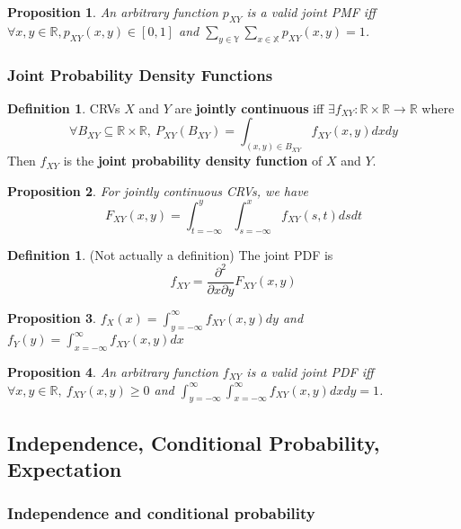 \documentclass[12pt]{article}
\newtheorem*{prop*}{Proposition}
\theoremstyle{definition}
\newtheorem{defn}{Definition}[subsection]
\newtheorem*{defn*}{Definition}
\newcommand{\R}{\mathbb{R}}
\newcommand{\X}{\mathbb{X}}
\newcommand{\Y}{\mathbb{Y}}
\begin{document}
\begin{prop*}
  An arbitrary function $p_{XY}$ is a valid joint PMF iff $\forall x, y \in \R, p_{XY}(x, y) \in [0, 1]$ and $\sum_{y \in \Y}\sum_{x \in \X}p_{XY}(x, y) = 1$.
\end{prop*}

\subsubsection{Joint Probability Density Functions}

\begin{defn*}
  CRVs $X$ and $Y$ are \textbf{jointly continuous} iff $\exists f_{XY} : \R \times \R \to \R$ where
  $$\forall B_{XY} \subseteq \R \times \R,\ P_{XY}(B_{XY}) = \int_{(x, y) \in B_{XY}}f_{XY}(x, y)dxdy$$
  Then $f_{XY}$ is the \textbf{joint probability density function} of $X$ and $Y$.
\end{defn*}

\begin{prop*}
  For jointly continuous CRVs, we have
  $$F_{XY}(x, y) = \int_{t = -\infty}^y\int_{s = -\infty}^xf_{XY}(s, t)dsdt$$
\end{prop*}

\begin{defn}
  (Not actually a definition)
  The joint PDF is
  $$f_{XY} = \frac{\partial^2}{\partial x\partial y}F_{XY}(x, y)$$
\end{defn}

\begin{prop*}
  $f_X(x) = \int_{y = -\infty}^{\infty}f_{XY}(x, y)dy$ and $f_Y(y) = \int_{x = -\infty}^{\infty}f_{XY}(x, y)dx$
\end{prop*}

\begin{prop*}
  An arbitrary function $f_{XY}$ is a valid joint PDF iff $\forall x, y \in \R,\ f_{XY}(x, y) \geq 0$ and $\int_{y = -\infty}^{\infty}\int_{x = -\infty}^{\infty}f_{XY}(x, y)dxdy = 1$.
\end{prop*}

\subsection{Independence, Conditional Probability, Expectation}

\subsubsection{Independence and conditional probability}
\end{document}

